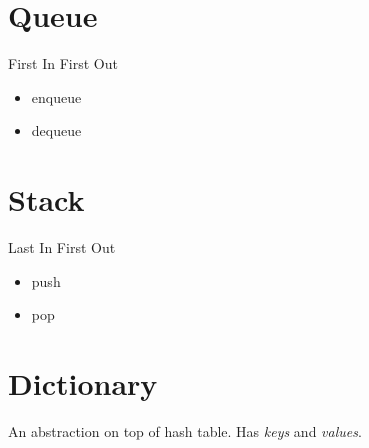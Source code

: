 \section{Queue}
First In First Out
\begin{itemize}
	\item enqueue
	\item dequeue
\end{itemize}

\section{Stack}
Last In First Out
\begin{itemize}
	\item push
	\item pop
\end{itemize}

\section{Dictionary}
An abstraction on top of hash table.
Has \emph{keys} and \emph{values}.







